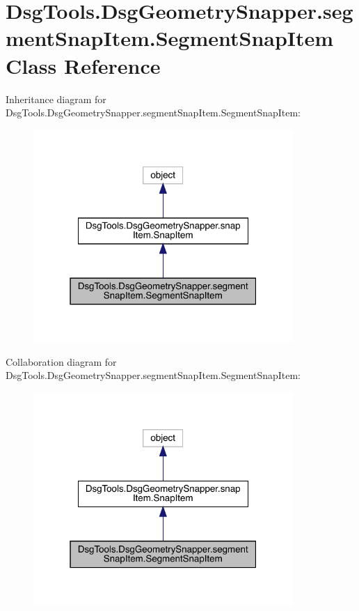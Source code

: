 \hypertarget{class_dsg_tools_1_1_dsg_geometry_snapper_1_1segment_snap_item_1_1_segment_snap_item}{}\section{Dsg\+Tools.\+Dsg\+Geometry\+Snapper.\+segment\+Snap\+Item.\+Segment\+Snap\+Item Class Reference}
\label{class_dsg_tools_1_1_dsg_geometry_snapper_1_1segment_snap_item_1_1_segment_snap_item}


Inheritance diagram for Dsg\+Tools.\+Dsg\+Geometry\+Snapper.\+segment\+Snap\+Item.\+Segment\+Snap\+Item\+:
\nopagebreak
\begin{figure}[H]
\begin{center}
\leavevmode
\includegraphics[width=280pt]{class_dsg_tools_1_1_dsg_geometry_snapper_1_1segment_snap_item_1_1_segment_snap_item__inherit__graph}
\end{center}
\end{figure}


Collaboration diagram for Dsg\+Tools.\+Dsg\+Geometry\+Snapper.\+segment\+Snap\+Item.\+Segment\+Snap\+Item\+:
\nopagebreak
\begin{figure}[H]
\begin{center}
\leavevmode
\includegraphics[width=280pt]{class_dsg_tools_1_1_dsg_geometry_snapper_1_1segment_snap_item_1_1_segment_snap_item__coll__graph}
\end{center}
\end{figure}
